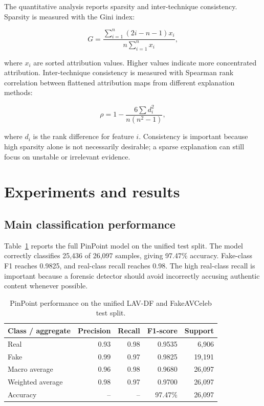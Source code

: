 \documentclass[preprint,12pt,number]{elsarticle}
\begin{document}
The quantitative analysis reports sparsity and inter-technique consistency. Sparsity is measured with the Gini index:

\begin{equation}
G = \frac{\sum_{i=1}^{n}(2i-n-1)x_i}{n\sum_{i=1}^{n}x_i},
\label{eq:gini}
\end{equation}

where $x_i$ are sorted attribution values. Higher values indicate more concentrated attribution. Inter-technique consistency is measured with Spearman rank correlation between flattened attribution maps from different explanation methods:

\begin{equation}
\rho = 1 - \frac{6\sum d_i^2}{n(n^2-1)},
\label{eq:spearman}
\end{equation}

where $d_i$ is the rank difference for feature $i$. Consistency is important because high sparsity alone is not necessarily desirable; a sparse explanation can still focus on unstable or irrelevant evidence.

\section{Experiments and results}
\label{sec:experiments}

\subsection{Main classification performance}
\label{subsec:main_results}

Table~\ref{tab:main_performance} reports the full PinPoint model on the unified test split. The model correctly classifies 25,436 of 26,097 samples, giving 97.47\% accuracy. Fake-class F1 reaches 0.9825, and real-class recall reaches 0.98. The high real-class recall is important because a forensic detector should avoid incorrectly accusing authentic content whenever possible.

\begin{table}[H]
\caption{PinPoint performance on the unified LAV-DF and FakeAVCeleb test split.}
\label{tab:main_performance}
\centering
\begin{tabular}{lrrrr}
\toprule
Class / aggregate & Precision & Recall & F1-score & Support \\
\midrule
Real & 0.93 & 0.98 & 0.9535 & 6,906 \\
Fake & 0.99 & 0.97 & 0.9825 & 19,191 \\
\midrule
Macro average & 0.96 & 0.98 & 0.9680 & 26,097 \\
Weighted average & 0.98 & 0.97 & 0.9700 & 26,097 \\
Accuracy & -- & -- & 97.47\% & 26,097 \\
\bottomrule
\end{tabular}
\end{table}
\end{document}
